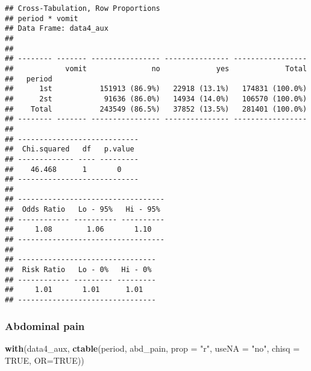 \documentclass[
]{article}
\newenvironment{Shaded}{\begin{snugshade}}{\end{snugshade}}
\newcommand{\DataTypeTok}[1]{\textcolor[rgb]{0.13,0.29,0.53}{#1}}
\newcommand{\KeywordTok}[1]{\textcolor[rgb]{0.13,0.29,0.53}{\textbf{#1}}}
\newcommand{\NormalTok}[1]{#1}
\newcommand{\OtherTok}[1]{\textcolor[rgb]{0.56,0.35,0.01}{#1}}
\newcommand{\StringTok}[1]{\textcolor[rgb]{0.31,0.60,0.02}{#1}}
\begin{document}
\begin{verbatim}
## Cross-Tabulation, Row Proportions  
## period * vomit  
## Data Frame: data4_aux  
## 
## 
## -------- ------- ---------------- --------------- -----------------
##            vomit               no             yes             Total
##   period                                                           
##      1st           151913 (86.9%)   22918 (13.1%)   174831 (100.0%)
##      2st            91636 (86.0%)   14934 (14.0%)   106570 (100.0%)
##    Total           243549 (86.5%)   37852 (13.5%)   281401 (100.0%)
## -------- ------- ---------------- --------------- -----------------
## 
## ----------------------------
##  Chi.squared   df   p.value 
## ------------- ---- ---------
##    46.468      1       0    
## ----------------------------
## 
## ----------------------------------
##  Odds Ratio   Lo - 95%   Hi - 95% 
## ------------ ---------- ----------
##     1.08        1.06       1.10   
## ----------------------------------
## 
## --------------------------------
##  Risk Ratio   Lo - 0%   Hi - 0% 
## ------------ --------- ---------
##     1.01       1.01      1.01   
## --------------------------------
\end{verbatim}

\hypertarget{abdominal-pain}{%
\subsubsection{Abdominal pain}\label{abdominal-pain}}

\begin{Shaded}
\begin{Highlighting}[]
\KeywordTok{with}\NormalTok{(data4_aux, }\KeywordTok{ctable}\NormalTok{(period, abd_pain, }\DataTypeTok{prop =} \StringTok{"r"}\NormalTok{, }\DataTypeTok{useNA =} \StringTok{"no"}\NormalTok{, }\DataTypeTok{chisq =} \OtherTok{TRUE}\NormalTok{, }\DataTypeTok{OR=}\OtherTok{TRUE}\NormalTok{))}
\end{Highlighting}
\end{Shaded}
\end{document}
